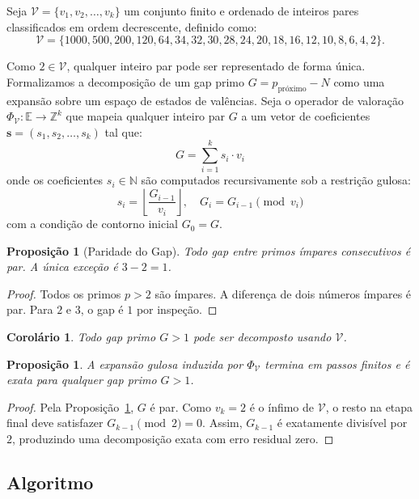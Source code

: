 \documentclass[12pt,a4paper]{article}
\theoremstyle{plain}
\newtheorem{proposition}[theorem]{Proposição}
\newtheorem{corollary}[theorem]{Corolário}
\begin{document}
Seja $\mathcal{V} = \{v_1, v_2, \dots, v_k\}$ um conjunto finito e ordenado de
inteiros pares classificados em ordem decrescente, definido como:
\[
\mathcal{V} = \{1000, 500, 200, 120, 64, 34, 32, 30, 28, 24,
20, 18, 16, 12, 10, 8, 6, 4, 2\}.
\]

Como $2 \in \mathcal{V}$, qualquer inteiro par pode ser representado de forma única.
Formalizamos a decomposição de um gap primo $G = p_{\text{próximo}} - N$
como uma expansão sobre um espaço de estados de valências.  Seja o operador
de valoração $\Phi_{\mathcal{V}}: \mathbb{E} \to \mathbb{Z}^k$ que mapeia qualquer inteiro
par $G$ a um vetor de coeficientes $\mathbf{s} = (s_1, s_2, \dots, s_k)$
tal que:
\[
G = \sum_{i=1}^{k} s_i \cdot v_i
\]
onde os coeficientes $s_i \in \mathbb{N}$ são computados recursivamente
sob a restrição gulosa:
\[
s_i = \left\lfloor \frac{G_{i-1}}{v_i} \right\rfloor,\quad
G_i = G_{i-1} \pmod{v_i}
\]
com a condição de contorno inicial $G_0 = G$.

\begin{proposition}[Paridade do Gap]
\label{prop:parity}
Todo gap entre primos ímpares consecutivos é par.
A única exceção é $3-2=1$.
\end{proposition}
\begin{proof}
Todos os primos $p>2$ são ímpares.  A diferença de dois números ímpares é par.
Para $2$ e $3$, o gap é $1$ por inspeção.
\end{proof}

\begin{corollary}
\label{coro:decomp}
Todo gap primo $G>1$ pode ser decomposto usando $\mathcal{V}$.
\end{corollary}

\begin{proposition}
\label{prop:greedy}
A expansão gulosa induzida por $\Phi_{\mathcal{V}}$ termina em
passos finitos e é exata para qualquer gap primo $G > 1$.
\end{proposition}
\begin{proof}
Pela Proposição~\ref{prop:parity}, $G$ é par.  Como
$v_k = 2$ é o ínfimo de $\mathcal{V}$, o resto na
etapa final deve satisfazer $G_{k-1} \pmod 2 = 0$.  Assim,
$G_{k-1}$ é exatamente divisível por $2$, produzindo uma
decomposição exata com erro residual zero.
\end{proof}

\subsection{Algoritmo}
\label{sec:algo}
\end{document}
